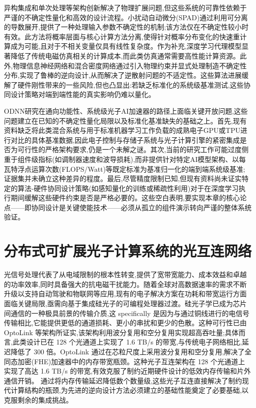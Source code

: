 异构集成和单次处理等架构创新解决了物理扩展问题,但这些系统的可靠性依赖于严谨的不确定性量化和高效的设计流程。小扰动自动微分(SPAD)通过利用可分离的导数展开,提供了一种处理输入参数不确定性的机制;该方法仅在不确定性较小时有效。此方法将概率层面与核心计算方法分离,使得针对概率分布变化的快速重计算成为可能,且对于不相关变量仅具有线性复杂度。作为补充,深度学习代理模型显著降低了传统电磁仿真相关的计算成本,而此类仿真通常需要高性能计算资源。此外,物理信息神经网络和混合密度网络通过引入物理约束并显式处理制造不确定性分布,实现了鲁棒的逆向设计,从而解决了逆散射问题的不适定性。这些算法进展缓解了硬件刚性带来的一些风险,但也凸显出:若缺乏标准化的系统级基准测试,这些协同设计策略对端到端性能的真实影响仍难以量化。\citep{s2_964fe0d656467421d5df282abd0e0a2aca877e7e_399e029e} \citep{doi_10_1109_sbfotoniopc62248_2024_10813471_692f0088} \citep{s2_037e66f37189104d61c0d000de0cee202b7eec9e_d15b8018}

ODNN研究在通向功能性、系统级光子AI加速器的路径上面临关键开放问题,这些问题建立在已知的不确定性量化局限以及标准化基准缺失的基础之上。首先,现有资料缺乏将此类混合系统与用于标准机器学习工作负载的成熟电子GPU或TPU进行对比的具体基准数据,因此电子控制与存储子系统与光子计算引擎的紧密集成是否为可行性的严格架构要求,仍是一个未解之谜。其次,当前的研究工作可能过度侧重于组件级指标(如调制器速度和波导损耗),而非提供针对特定AI模型架构、以每瓦特浮点运算次数(FLOPS/Watt)等既定标准为基准归一化的端到端系统级基准;证据集并未确立这种差异的程度。最后,尽管精度限制已知,但现有资料尚未证实特定的算法-硬件协同设计策略(如感知量化的训练或稀疏性利用)对于在深度学习执行期间缓解这些硬件约束是否是严格必要的。这些空白表明,要实现本章的核心论点------即协同设计是关键使能技术------必须从孤立的组件演示转向严谨的整体系统验证。

\section{分布式可扩展光子计算系统的光互连网络}\label{ux5206ux5e03ux5f0fux53efux6269ux5c55ux5149ux5b50ux8ba1ux7b97ux7cfbux7edfux7684ux5149ux4e92ux8fdeux7f51ux7edc}

光信号处理代表了从电域限制的根本性转变,提供了宽带宽能力、成本效益和卓越的功率效率,同时具备强大的抗电磁干扰能力。随着全球对高数据速率的需求不断升级以支持自动驾驶和物联网等应用,现有的电子解决方案在功耗和带宽运行方面面临关键局限,亟需向基于集成硅光子的可编程处理器过渡。硅光子学已成为芯片间通信的一种极具前景的传输介质,这 specifically 是因为与通过铜线进行的电信号传输相比,它能提供更低的通道损耗、更小的串扰和更少的色散。这种可行性已由 OptoLink 等架构所证实,该架构利用波分复用和空分复用实现超高吞吐量;具体而言,此类设计已在 128 个光通道上实现了 1.6 TB/s 的带宽,与传统电子网络相比,延迟降低了 300 倍。OptoLink 通过在芯粒尺度上采用波分复用和空分复用,解决了全同态加密(FHE)加速器中的内存带宽瓶颈。这种光子互连架构在 128 个光通道上实现了高达 1.6 TB/s 的带宽,有效克服了制约近期硬件设计的低效内存传输和片外通信开销。\citep{doi_10_1145_3806395_315ab915} 通过将内存传输延迟降低数个数量级,这些光子互连直接解决了制约现代计算结构的瓶颈,为先进的逆向设计方法必须建立的基础性能奠定了必要基础,以克服剩余的集成挑战。\citep{doi_10_1109_access_2020_3013116_8fec1fb2} \citep{doi_10_1145_3806395_315ab915} \citep{doi_10_1007_s11082_024_08009_8_0f7f241e}

